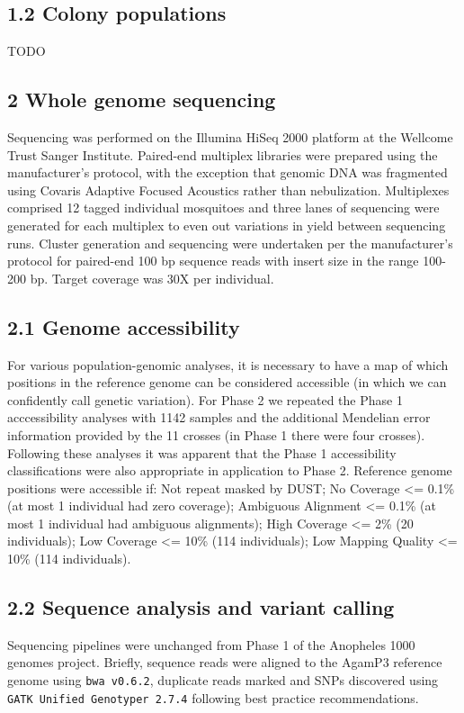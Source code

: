 \documentclass[a4paper,11pt,abstracton,hidelinks]{scrartcl}
\begin{document}
\subsection*{1.2 Colony populations}

TODO

\subsection*{2 Whole genome sequencing}

%
Sequencing was performed on the Illumina HiSeq 2000 platform at the Wellcome Trust Sanger Institute.
%
Paired-end multiplex libraries were prepared using the manufacturer's protocol, with the exception that genomic DNA was fragmented using Covaris Adaptive Focused Acoustics rather than nebulization.
%
Multiplexes comprised 12 tagged individual mosquitoes and three lanes of sequencing were generated for each multiplex to even out variations in yield between sequencing runs.
%
Cluster generation and sequencing were undertaken per the manufacturer's protocol for paired-end 100 bp sequence reads with insert size in the range 100-200 bp.
%
Target coverage was 30X per individual.


\subsection*{2.1 Genome accessibility}

%
For various population-genomic analyses, it is necessary to have a map of which positions in the reference genome can be considered accessible (in which we can confidently call genetic variation).
%
For Phase 2 we repeated the Phase 1 acccessibility analyses \cite{Ag1000gConsortium2017} with 1142 samples and the additional Mendelian error information provided by the 11 crosses (in Phase 1 there were four crosses).
%
Following these analyses it was apparent that the Phase 1 accessibility classifications were also appropriate in application to Phase 2.
%
Reference genome positions were accessible if: 
Not repeat masked by DUST; 
No Coverage <= 0.1\% (at most 1 individual had zero coverage); 
Ambiguous Alignment <= 0.1\% (at most 1 individual had ambiguous alignments); 
High Coverage <= 2\% (20 individuals); 
Low Coverage <= 10\% (114 individuals); 
Low Mapping Quality <= 10\% (114 individuals).

\subsection*{2.2 Sequence analysis and variant calling}
%
Sequencing pipelines were unchanged from Phase 1 of the Anopheles 1000 genomes project\cite{Ag1000gConsortium2017}.
%
Briefly, sequence reads were aligned to the AgamP3 reference genome \cite{sharakhova2007update} using \texttt{bwa v0.6.2}, duplicate reads marked \cite{li2009} and SNPs discovered using \texttt{GATK Unified Genotyper 2.7.4} \cite{van2013} following best practice recommendations. 
\end{document}
